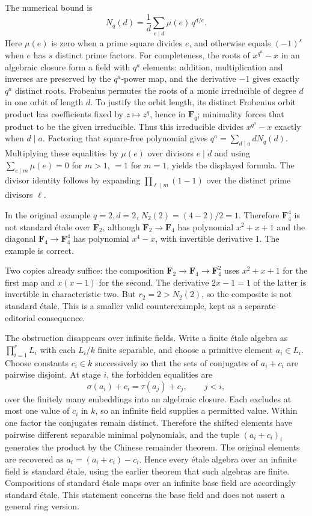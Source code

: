 The numerical bound is \[
N_q(d)=\frac1d\sum_{e\mid d}\mu(e)\,q^{d/e}.
\] Here \(\mu(e)\) is zero when a prime square divides \(e\), and otherwise equals \((-1)^s\) when \(e\) has \(s\) distinct prime factors. For completeness, the roots of \(x^{q^a}-x\) in an algebraic closure form a field with \(q^a\) elements: addition, multiplication and inverses are preserved by the \(q^a\)-power map, and the derivative \(-1\) gives exactly \(q^a\) distinct roots. Frobenius permutes the roots of a monic irreducible of degree \(d\) in one orbit of length \(d\). To justify the orbit length, its distinct Frobenius orbit product has coefficients fixed by \(z\mapsto z^q\), hence in \(\mathbf F_q\); minimality forces that product to be the given irreducible. Thus this irreducible divides \(x^{q^a}-x\) exactly when \(d\mid a\). Factoring that square-free polynomial gives \(q^a=\sum_{d\mid a}dN_q(d)\). Multiplying these equalities by \(\mu(e)\) over divisors \(e\mid d\) and using \(\sum_{e\mid m}\mu(e)=0\) for \(m>1\), \(=1\) for \(m=1\), yields the displayed formula. The divisor identity follows by expanding \(\prod_{\ell\mid m}(1-1)\) over the distinct prime divisors \(\ell\).

In the original example \(q=2,d=2\), \(N_2(2)=(4-2)/2=1\). Therefore \(\mathbf F_4^4\) is not standard étale over \(\mathbf F_2\), although \(\mathbf F_2\to\mathbf F_4\) has polynomial \(x^2+x+1\) and the diagonal \(\mathbf F_4\to\mathbf F_4^4\) has polynomial \(x^4-x\), with invertible derivative \(1\). The example is correct.

Two copies already suffice: the composition \(\mathbf F_2\to\mathbf F_4\to\mathbf F_4^2\) uses \(x^2+x+1\) for the first map and \(x(x-1)\) for the second. The derivative \(2x-1=1\) of the latter is invertible in characteristic two. But \(r_2=2>N_2(2)\), so the composite is not standard étale. This is a smaller valid counterexample, kept as a separate editorial consequence.

The obstruction disappears over infinite fields. Write a finite étale algebra as \(\prod_{i=1}^r L_i\) with each \(L_i/k\) finite separable, and choose a primitive element \(a_i\in L_i\). Choose constants \(c_i\in k\) successively so that the sets of conjugates of \(a_i+c_i\) are pairwise disjoint. At stage \(i\), the forbidden equalities are \[
\sigma(a_i)+c_i=\tau(a_j)+c_j,\qquad j<i,
\] over the finitely many embeddings into an algebraic closure. Each excludes at most one value of \(c_i\) in \(k\), so an infinite field supplies a permitted value. Within one factor the conjugates remain distinct. Therefore the shifted elements have pairwise different separable minimal polynomials, and the tuple \((a_i+c_i)_i\) generates the product by the Chinese remainder theorem. The original elements are recovered as \(a_i=(a_i+c_i)-c_i\). Hence every étale algebra over an infinite field is standard étale, using the earlier theorem that such algebras are finite. Compositions of standard étale maps over an infinite base field are accordingly standard étale. This statement concerns the base field and does not assert a general ring version.

